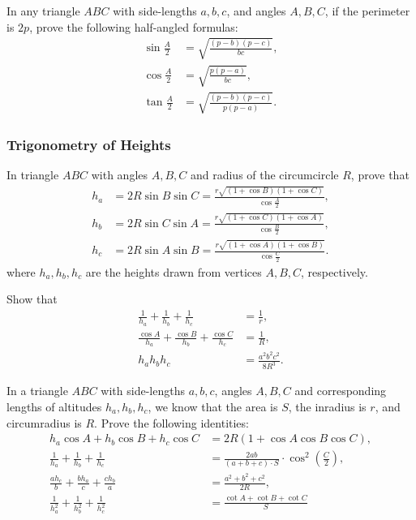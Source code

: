 \documentclass[12pt,a4paper]{memoir}
\theoremstyle{definition}
\begin{document}
\begin{question}
	In any triangle $ABC$ with side-lengths $a,b,c$, and angles $A,B,C$, if the perimeter is $2p$, prove the following half-angled formulas:
	\begin{align*}
		\sin\frac{A}{2} &= \sqrt{\frac{(p-b)(p-c)}{bc}},\\
		\cos\frac{A}{2} &= \sqrt{\frac{p(p-a)}{bc}},\\
		\tan\frac{A}{2} &= \sqrt{\frac{(p-b)(p-c)}{p(p-a)}}.
	\end{align*}
\end{question}

\subsubsection{Trigonometry of Heights}


	\begin{question}[name=Calculating the Height of Triangle]
		In triangle $ABC$ with angles $A,B,C$ and radius of the circumcircle $R$, prove that
		\begin{align*}
			h_a &= 2R \sin B \sin C = \frac{r\sqrt{(1+\cos B)(1+\cos C)}}{\cos \displaystyle \frac{A}{2}},\\
			h_b &= 2R \sin C \sin A = \frac{r\sqrt{(1+\cos C)(1+\cos A)}}{\cos \displaystyle \frac{B}{2}},\\
			h_c &= 2R \sin A \sin B=  \frac{r\sqrt{(1+\cos A)(1+\cos B)}}{\cos \displaystyle \frac{C}{2}}.
		\end{align*}
		where $h_a,h_b,h_c$ are the heights drawn from vertices $A,B,C$, respectively.
	\end{question}


\begin{question}
	Show that
	\begin{align*}
		\frac{1}{h_a}+\frac{1}{h_b}+\frac{1}{h_c} &= \frac{1}{r},\\
		\frac{\cos A}{h_a}+\frac{\cos B}{h_b}+\frac{\cos C}{h_c} &=\frac{1}{R},\\
		h_ah_bh_c &= \frac{a^2b^2c^2}{8R^3}.
	\end{align*}
\end{question}

\begin{question}[name={Identities on Lengths of Heights}]
	In a triangle $ABC$ with side-lengths $a,b,c$, angles $A,B,C$ and corresponding lengths of altitudes $h_a,h_b,h_c$, we know that the area is $S$, the inradius is $r$, and circumradius is $R$. Prove the following identities:
	\begin{align*}
		h_a\cos A + h_b\cos B + h_c\cos C &= 2R(1+\cos A \cos B \cos C),\\
		\frac{1}{h_a}+\frac{1}{h_b}+\frac{1}{h_c} &=\frac{2ab}{(a+b+c)\cdot S}\cdot \cos^2\left(\frac{C}{2}\right),\\
		\frac{ah_c}{b}+\frac{bh_a}{c}+\frac{ch_b}{a} &= \frac{a^2+b^2+c^2}{2R},\\
		\frac{1}{h_a^2}+\frac{1}{h_b^2}+\frac{1}{h_c^2} &=\frac{\cot A + \cot B + \cot C}{S}
	\end{align*}
\end{question}
\end{document}
